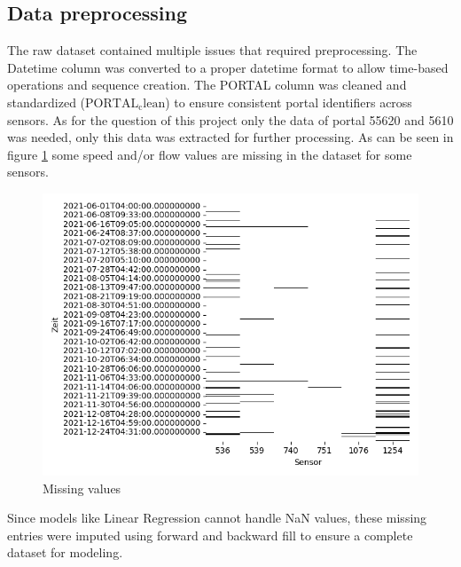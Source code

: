 	\subsection{Data preprocessing} \label{chap:dataprepro}
	The raw dataset contained multiple issues that required preprocessing.
	The Datetime column was converted to a proper datetime format to allow time-based operations and sequence creation.
	The PORTAL column was cleaned and standardized ($\mathrm{PORTAL_clean}$) to ensure consistent portal identifiers across sensors.\newline 
	As for the question of this project only the data of portal 55620 and 5610 was needed, only this data was extracted for further processing. \newline 
	As can be seen in figure \ref{fig:missingvalues} some speed and/or flow values are missing in the dataset for some sensors.
	\begin{figure}[H]
		\centering
		\includegraphics[width =0.5 \linewidth]{../Plots/missingvalues}
		\caption{Missing values}
		\label{fig:missingvalues}
	\end{figure}
	\noindent Since models like Linear Regression cannot handle NaN values, these missing entries were imputed using forward and backward fill to ensure a complete dataset for modeling.
